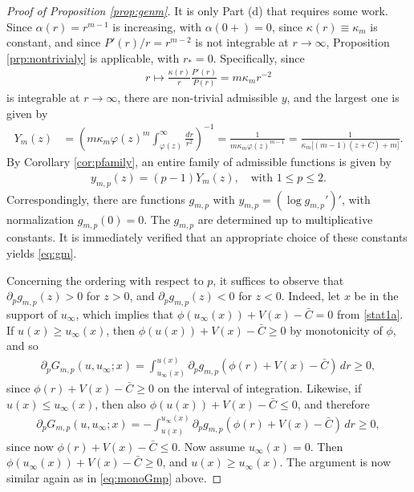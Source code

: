 \documentclass[reqno]{amsart}
\begin{document}
\begin{proof}[Proof of Proposition \ref{prop:genm}]
    It is only Part (d) that requires some work. Since $\alpha(r)=r^{m-1}$ is increasing, with $\alpha(0+)=0$, since $\kappa(r)\equiv\kappa_m$ is constant, and since $P'(r)/r=r^{m-2}$ is not integrable at $r\to\infty$, Proposition \ref{prp:nontrivialy} is applicable, with $r_*=0$. Specifically, since
    \begin{align*}
        r\mapsto \frac{\kappa(r)}{r}\frac{P'(r)}{P(r)} = m\kappa_m r^{-2}
    \end{align*}
    is integrable at $r\to\infty$, there are non-trivial admissible $y$, and the largest one is given by
    \begin{align}\label{Ym}
        Y_m(z) &= 
        \left(m\kappa_m\varphi(z)^{m}\int_{\varphi(z)}^\infty\frac{dr}{r^2}\right)^{-1}
        = \frac1{m\kappa_m\varphi(z)^{m-1}}
        = \frac1{\kappa_m\big[(m-1)(z+\bar C)+m\big]}.
    \end{align}
    By Corollary \ref{cor:pfamily}, an entire family of admissible functions is given by
    \begin{align*}
        y_{m,p}(z) = (p-1)Y_m(z), \quad \text{with $1\le p\le2$.}
    \end{align*}
    Correspondingly, there are functions $g_{m,p}$ with $y_{m,p}=(\log g_{m,p}')'$, with normalization $g_{m,p}(0)=0$. The $g_{m,p}$ are determined up to multiplicative constants. It is immediately verified that an appropriate choice of these constants yields \eqref{eq:gm}.
    
    Concerning the ordering with respect to $p$, it suffices to observe that $\partial_p g_{m,p}(z)>0$ for $z>0$, and $\partial_p g_{m,p}(z)<0$ for $z<0$. Indeed, let $x$ be in the support of $u_\infty$, which implies that $\phi(u_\infty(x))+V(x)-\bar C=0$ from \eqref{stat1a}. If $u(x)\ge u_\infty(x)$, then $\phi(u(x))+V(x)-\bar C\ge 0$ by monotonicity of $\phi$, and so
    \begin{align}\label{eq:monoGmp}
        \partial_pG_{m,p}(u,u_\infty;x) = \int_{u_\infty(x)}^{u(x)}\partial_pg_{m,p}(\phi(r)+V(x)-\bar C)\,dr \ge 0,
    \end{align}
    since $\phi(r)+V(x)-\bar C\ge0$ on the interval of integration. Likewise, if $u(x)\le u_\infty(x)$, then also $\phi(u(x))+V(x)-\bar C\le 0$, and therefore
    \begin{align*}
        \partial_pG_{m,p}(u,u_\infty;x) = -\int_{u(x)}^{u_\infty(x)}\partial_pg_{m,p}(\phi(r)+V(x)-\bar C)\,dr \ge 0,
    \end{align*}
    since now $\phi(r)+V(x)-\bar C\le0$. Now assume $u_\infty(x)=0$. Then $\phi(u_\infty(x))+V(x)-\bar C\ge0$, and $u(x)\ge u_\infty(x)$. The argument is now similar again as in \eqref{eq:monoGmp} above.


\end{proof}
\end{document}
